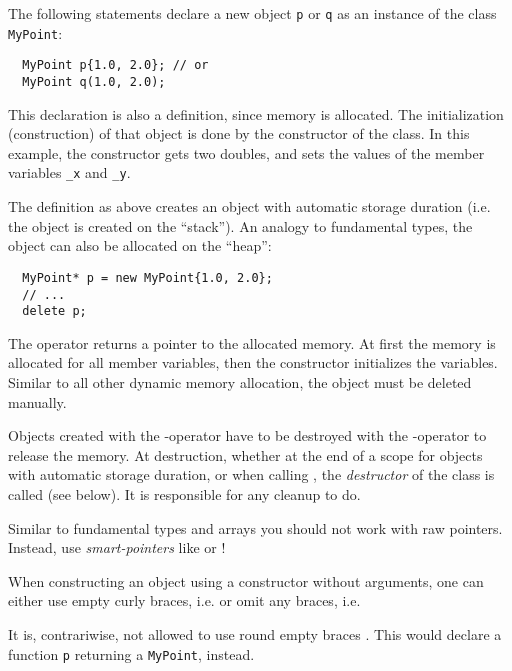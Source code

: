The following statements declare a new object \texttt{p} or \texttt{q} as an instance of the class \texttt{MyPoint}:
%
\begin{verbatim}
  MyPoint p{1.0, 2.0}; // or
  MyPoint q(1.0, 2.0);
\end{verbatim}
%
This declaration is also a definition, since memory is allocated. The initialization (construction) of that object is done by the constructor of the class.
In this example, the constructor gets two doubles, and sets the values of the member variables \texttt{\_x} and \texttt{\_y}.

The definition as above creates an object with automatic storage duration (i.e. the object is created on the ``stack''). An analogy to fundamental types,
the object can also be allocated on the ``heap'':
%
\begin{verbatim}
  MyPoint* p = new MyPoint{1.0, 2.0};
  // ...
  delete p;
\end{verbatim}
The operator  returns a pointer to the allocated memory. At first the memory is allocated for all member variables, then the constructor initializes
the variables. Similar to all other dynamic memory allocation, the object must be deleted manually.

Objects created with the -operator have to be destroyed with the -operator to release the memory. At destruction, whether at the end of
a scope for objects with automatic storage duration, or when calling , the \emph{destructor} of the class is called (see below). It is responsible
for any cleanup to do.

\begin{rem}
  Similar to fundamental types and arrays you should not work with raw pointers. Instead, use \emph{smart-pointers} like  or !
\end{rem}

\begin{rem}
  When constructing an object using a constructor without arguments, one can either use empty curly braces, i.e.
  or omit any braces, i.e.

  It is, contrariwise, not allowed to use round empty braces . This would declare a function \texttt{p} returning a \texttt{MyPoint}, instead.
\end{rem}


